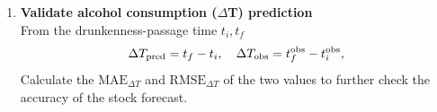 \documentclass[11pt]{article}
\begin{document}
\begin{enumerate}
    \item \textbf{Validate alcohol consumption ($\Delta $T) prediction}\\
    From the drunkenness-passage time \(t_i,t_f\)
    \[
      \Delta T_{\rm pred}
      = t_f - t_i,
      \quad
      \Delta T_{\rm obs}
      = t_f^{\rm obs} - t_i^{\rm obs},
    \]
    Calculate the \(\mathrm{MAE}_{\Delta T}\) and \(\mathrm{RMSE}_{\Delta T}\) of the two values to further check the accuracy of the stock forecast.
\end{enumerate}



    

    

\end{document}
